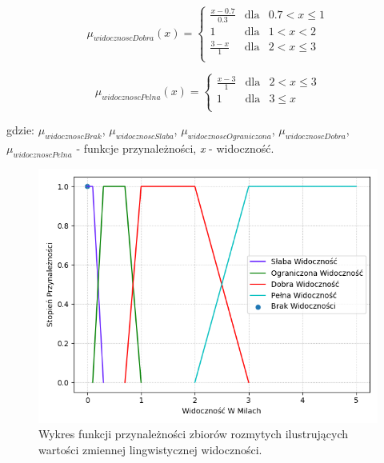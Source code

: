 \documentclass{classrep}
\begin{document}
\begin{equation}
\mu _{widocznoscDobra}(x) =  \left\{ \begin{array}{rcl}
\frac{x - 0.7}{0.3} & \mbox{dla} & 0.7 < x \leq 1\\
1 & \mbox{dla} & 1 < x < 2\\
\frac{3 - x}{1} & \mbox{dla} & 2 < x \leq 3\\
\end{array}\right.
\end{equation}

\begin{equation}
\mu _{widocznoscPelna}(x) =  \left\{ \begin{array}{rcl}
\frac{x - 3}{1} & \mbox{dla} & 2 < x \leq 3\\
1 & \mbox{dla} & 3 \leq x\\
\end{array}\right.
\end{equation}

gdzie: \(\mu _{widocznoscBrak}\), \(\mu _{widocznoscSlaba}\), \(\mu _{widocznoscOgraniczona}\), \(\mu _{widocznoscDobra}\), \(\mu _{widocznoscPelna}\)  - funkcje przynależności, \textit{x} - widoczność. 

\begin{figure}[h!]
 \centering
 \includegraphics[width=14cm]{FunkcjaPrzynaleznosciWidocznosc.png}
 \vspace{-0.3cm}
 \caption{Wykres funkcji przynależności zbiorów rozmytych ilustrujących wartości zmiennej lingwistycznej widoczności. }
 \label{rysunek do eksperymentu 1 wariantu 1}
\end{figure}
\newpage
\end{document}
